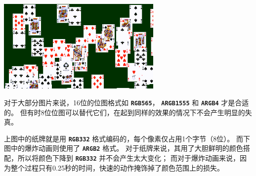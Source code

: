\documentclass[10pt]{book}
\newcommand{\mach}[1]{\texttt{\textbf{#1}}}
\begin{document}
\begin{CJK}{UTF8}{gkai}
\begin{center}
\includegraphics[width=0.6\textwidth]{assets/0034.png}
\end{center}

对于大部分图片来说，16位的位图格式如
\mach{RGB565}，
\mach{ARGB1555} 和
\mach{ARGB4} 才是合适的。
但有时8位位图可以替代它们，在起到同样的效果的情况下不会产生明显的失真。

上图中的纸牌就是用 \mach{RGB332} 格式编码的，每个像素仅占用1个字节（8位）。
而下图中的爆炸动画则使用了 \mach{ARGB2} 格式。
对于纸牌来说，其用了大胆鲜明的颜色搭配，所以将颜色下降到 \mach{RGB332} 并不会产生太大变化；
而对于爆炸动画来说，因为整个过程只有0.25秒的时间，快速的动作掩饰掉了颜色范围上的损失。


\end{CJK}
\end{document}
